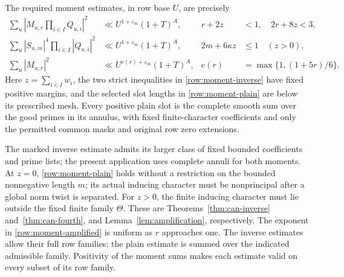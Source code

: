 \documentclass[11pt,a4paper]{article}
\numberwithin{equation}{section}
\theoremstyle{definition}
\theoremstyle{remark}
\newcommand{\eps}{\varepsilon}
\begin{document}
The required moment estimates, in row base \(U\), are precisely
\begin{align}
 \sum_u\left|M_{u,r}\prod_{i\in I}Q_{u,i}\right|^2
   &\ll U^{1+\eps_{\mathrm m}}(1+T)^A,
 &r+2z&<1,\quad 2r+8z<3,\label{row:moment-inverse}\\
 \sum_u |S_{u,m}|^4\prod_{i\in I}|Q_{u,i}|^2
   &\ll U^{1+\eps_{\mathrm m}}(1+T)^A,
 &2m+6\kappa z&\le1\quad(z>0),\label{row:moment-plain}\\
 \sum_u|M_{u,r}|^2
   &\ll U^{e(r)+\eps_{\mathrm m}}(1+T)^A,
 &e(r)&=\max\{1,(1+5r)/6\}.
 \label{row:moment-amplified}
\end{align}
Here \(z=\sum_{i\in I}w_i\), the two strict inequalities in
\eqref{row:moment-inverse} have fixed positive margins, and the selected
slot lengths in \eqref{row:moment-plain} are below its prescribed mesh.
Every positive plain slot is the complete smooth sum over the good
primes in its annulus, with fixed finite-character coefficients and
only the permitted common masks and original row zero extensions.

The marked inverse estimate admits its larger class of fixed bounded
coefficients and prime lists; the present application uses complete
annuli for both moments.
At \(z=0\), \eqref{row:moment-plain} holds without a restriction on the
bounded nonnegative length \(m\); its actual inducing character must
be nonprincipal after a global norm twist is separated.  For \(z>0\),
the finite inducing character must lie outside the fixed finite family
\(\Theta\).  These are
Theorems~\ref{thm:can-inverse} and~\ref{thm:can-fourth}, and
Lemma~\ref{lem:amplification}, respectively.  The exponent in
\eqref{row:moment-amplified} is uniform as \(r\) approaches one.
The inverse estimates allow their full row families; the plain estimate
is summed over the indicated admissible family.  Positivity of the
moment sums makes each estimate valid on every subset of its row family.
\end{document}
